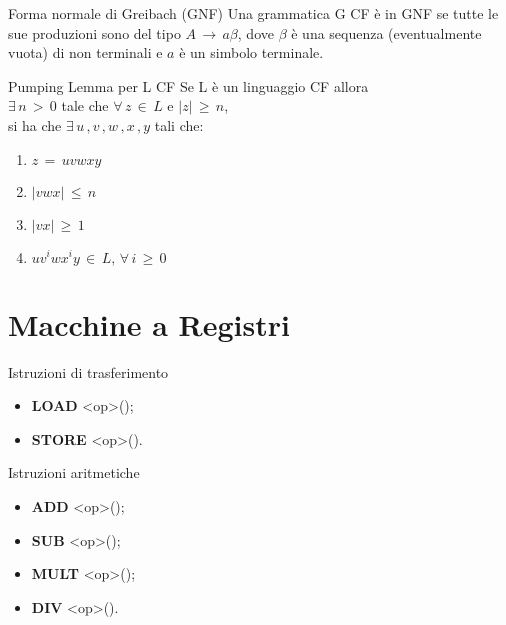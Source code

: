 \documentclass[10pt,a4paper]{article}
\begin{document}
\begin{multicols}{3}
\begin{textbox}{Forma normale di Greibach (GNF)}
Una grammatica G CF è in GNF se tutte le sue produzioni sono del tipo \(A\,\rightarrow\,a\beta\), dove \(\beta\) è una sequenza (eventualmente vuota) di non terminali e \(a\)  è un simbolo terminale.
\end{textbox}

\begin{textbox}{Pumping Lemma per L CF}
Se L è un linguaggio CF allora \\
\(\exists \, n \, > \, 0\) tale che \(\forall \, z \, \in \, L \) e
\(|z| \, \geq \, n\),\\si ha che
\(\exists \, u \, ,v \, ,w \, ,x \, ,y\) tali che:
\begin{enumerate}[leftmargin=*]
    \item \(z\, =\, uvwxy\)
    \item \(|vwx|\, \leq\,  n\)
    \item \(|vx|\, \geq\,  1\)
    \item \(uv^iwx^iy\,\in\,L,\,\forall\,i\,\geq\,0\)
\end{enumerate}
\end{textbox}


\section{Macchine a Registri}

\begin{textbox}{Istruzioni di trasferimento}
\begin{itemize}[leftmargin=*]
    \item \textbf{LOAD} <op>\quad();
    \item \textbf{STORE} <op>\quad().
\end{itemize}
\end{textbox}

\begin{textbox}{Istruzioni aritmetiche}
\begin{itemize}[leftmargin=*]
    \item \textbf{ADD} <op>\quad();
    \item \textbf{SUB} <op>\quad();
    \item \textbf{MULT} <op>\quad();
    \item \textbf{DIV} <op>\quad().
\end{itemize}
\end{textbox}


\end{multicols}
\end{document}
